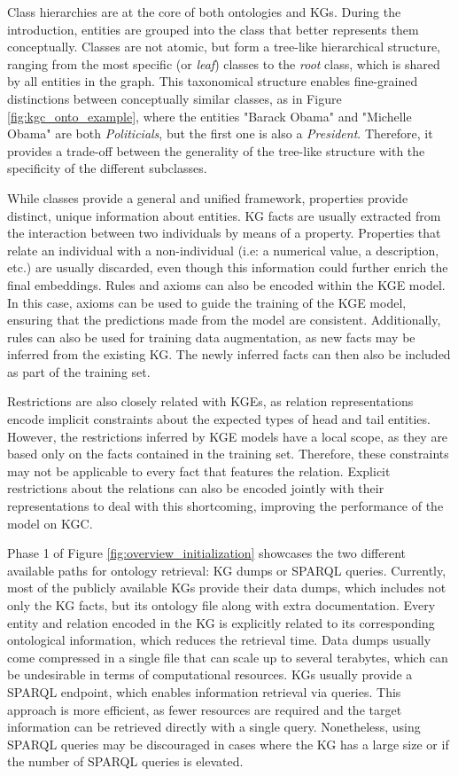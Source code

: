Class hierarchies are at the core of both ontologies and KGs. During the introduction, entities are grouped into the class that better represents them conceptually. Classes are not atomic, but form a tree-like hierarchical structure, ranging from the most specific (or \textit{leaf}) classes to the \textit{root} class, which is shared by all entities in the graph. This taxonomical structure enables fine-grained distinctions between conceptually similar classes, as in Figure \ref{fig:kgc_onto_example}, where the entities "Barack Obama" and "Michelle Obama" are both \textit{Politicials}, but the first one is also a \textit{President}. Therefore, it provides a trade-off between the generality of the tree-like structure with the specificity of the different subclasses. 

While classes provide a general and unified framework, properties provide distinct, unique information about entities. KG facts are usually extracted from the interaction between two individuals by means of a property. Properties that relate an individual with a non-individual (i.e: a numerical value, a description, etc.) are usually discarded, even though this information could further enrich the final embeddings. Rules and axioms can also be encoded within the KGE model. In this case, axioms can be used to guide the training of the KGE model, ensuring that the predictions made from the model are consistent. Additionally, rules can also be used for training data augmentation, as new facts may be inferred from the existing KG. The newly inferred facts can then also be included as part of the training set.

Restrictions are also closely related with KGEs, as relation representations encode implicit constraints about the expected types of head and tail entities. However, the restrictions inferred by KGE models have a local scope, as they are based only on the facts contained in the training set. Therefore, these constraints may not be applicable to every fact that features the relation. Explicit restrictions about the relations can also be encoded jointly with their representations to deal with this shortcoming, improving the performance of the model on KGC.

Phase 1 of Figure \ref{fig:overview_initialization} showcases the two different available paths for ontology retrieval: KG dumps or SPARQL queries. Currently, most of the publicly available KGs provide their data dumps, which includes not only the KG facts, but its ontology file along with extra documentation. Every entity and relation encoded in the KG is explicitly related to its corresponding ontological information, which reduces the retrieval time. Data dumps usually come compressed in a single file that can scale up to several terabytes, which can be undesirable in terms of computational resources. KGs usually provide a SPARQL endpoint, which enables information retrieval via queries. This approach is more efficient, as fewer resources are required and the target information can be retrieved directly with a single query. Nonetheless, using SPARQL queries may be discouraged in cases where the KG has a large size or if the number of SPARQL queries is elevated. 

